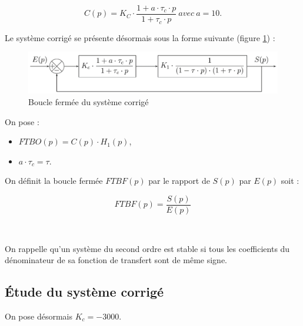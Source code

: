 $$C(p) = K_C \cdot \frac{1 + a \cdot \tau_c \cdot p}{1 + \tau_c \cdot p}
\ avec\ a = 10.$$

Le système corrigé se présente désormais sous la forme suivante (figure \ref{fig19}) :
\begin{figure}[ht!]
\centering\includegraphics[width=\linewidth]{img/fig19}
\caption{\label{fig19}Boucle fermée du système corrigé}
\end{figure}

On pose :
\begin{itemize}
 \item $FTBO(p) = C(p) \cdot H_1(p)$,
 \item$a \cdot \tau_c = \tau.$
\end{itemize}

On définit la boucle fermée $FTBF(p)$ par le rapport de $S(p)$ par $E(p)$ soit :

$$FTBF(p) = \frac{S(p)}{E(p)}$$


~\

On rappelle qu'un système du second ordre est stable si tous les coefficients du dénominateur de sa fonction de transfert sont de même signe.


\subsection{Étude du système corrigé}

On pose désormais $K_c = -3000$.

